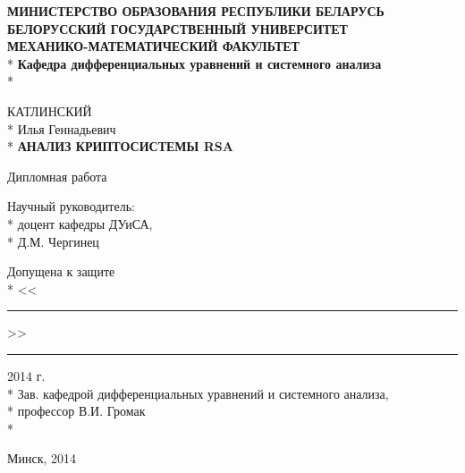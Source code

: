 \begin{titlepage}
	\newpage

	\begin{center}
		\textbf{МИНИСТЕРСТВО ОБРАЗОВАНИЯ РЕСПУБЛИКИ БЕЛАРУСЬ} \\
		\vspace{0.5cm}
		\textbf{БЕЛОРУССКИЙ ГОСУДАРСТВЕННЫЙ УНИВЕРСИТЕТ} \\
		\vspace{0.5cm}		
		\textbf{МЕХАНИКО-МАТЕМАТИЧЕСКИЙ ФАКУЛЬТЕТ} \\*
		\vspace{0.5cm}
		\textbf{Кафедра дифференциальных уравнений и системного анализа} \\*
	\end{center}

	\vspace{5em}

	\begin{center}
		КАТЛИНСКИЙ \\*
		Илья Геннадьевич \\*
		\vspace{0.5cm}
		\textbf{АНАЛИЗ КРИПТОСИСТЕМЫ RSA}
	\end{center}

	\vspace{2.5em}
	 
	\begin{center}
		Дипломная работа
	\end{center}

	\vspace{6em}
	 
	\begin{flushright}
		Научный руководитель: \\*
		доцент кафедры ДУиСА, \\*
		Д.М. Чергинец	
	\end{flushright}

	\begin{flushleft}
		Допущена к защите \\*
		\vspace{0.2cm}
		<<\rule{1cm}{0.2pt}>> \rule{4cm}{0.2pt} 2014 г.\\*
		\vspace{0.2cm}
		Зав. кафедрой дифференциальных уравнений и системного анализа, \\*
		профессор В.И. Громак \\*		
	\end{flushleft}
	 
	\vspace{\fill}

	\begin{center}
		Минск, 2014
	\end{center}

\end{titlepage}